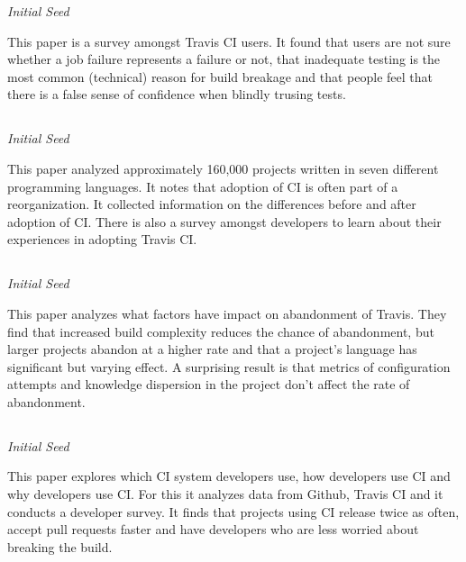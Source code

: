 \documentclass[]{book}
\begin{document}
\emph{Initial Seed}

This paper is a survey amongst Travis CI users. It found that users are
not sure whether a job failure represents a failure or not, that
inadequate testing is the most common (technical) reason for build
breakage and that people feel that there is a false sense of confidence
when blindly trusing tests.

\subsection{\texorpdfstring{\citet{zhao2017impact}}{@zhao2017impact}}\label{zhao2017impact}

\emph{Initial Seed}

This paper analyzed approximately 160,000 projects written in seven
different programming languages. It notes that adoption of CI is often
part of a reorganization. It collected information on the differences
before and after adoption of CI. There is also a survey amongst
developers to learn about their experiences in adopting Travis CI.

\subsection{\texorpdfstring{\citet{widder2018m}}{@widder2018m}}\label{widder2018m}

\emph{Initial Seed}

This paper analyzes what factors have impact on abandonment of Travis.
They find that increased build complexity reduces the chance of
abandonment, but larger projects abandon at a higher rate and that a
project's language has significant but varying effect. A surprising
result is that metrics of configuration attempts and knowledge
dispersion in the project don't affect the rate of abandonment.

\subsection{\texorpdfstring{\citet{hilton2016usage}}{@hilton2016usage}}\label{hilton2016usage}

\emph{Initial Seed}

This paper explores which CI system developers use, how developers use
CI and why developers use CI. For this it analyzes data from Github,
Travis CI and it conducts a developer survey. It finds that projects
using CI release twice as often, accept pull requests faster and have
developers who are less worried about breaking the build.
\end{document}
